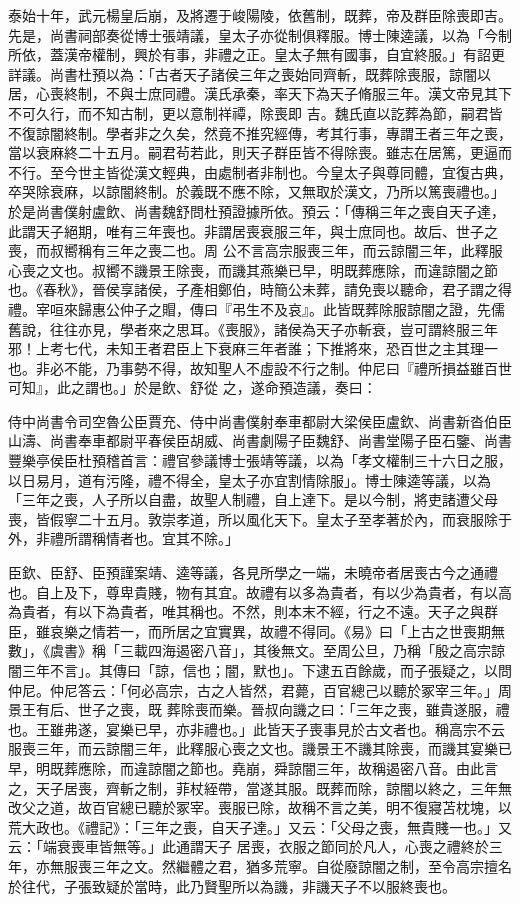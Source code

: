 \begin{pinyinscope}
 泰始十年，武元楊皇后崩，及將遷于峻陽陵，依舊制，既葬，帝及群臣除喪即吉。先是，尚書祠部奏從博士張靖議，皇太子亦從制俱釋服。博士陳逵議，以為「今制所依，蓋漢帝權制，興於有事，非禮之正。皇太子無有國事，自宜終服。」有詔更詳議。尚書杜預以為：「古者天子諸侯三年之喪始同齊斬，既葬除喪服，諒闇以居，心喪終制，不與士庶同禮。漢氏承秦，率天下為天子脩服三年。漢文帝見其下不可久行，而不知古制，更以意制祥禫，除喪即
 吉。魏氏直以訖葬為節，嗣君皆不復諒闇終制。學者非之久矣，然竟不推究經傳，考其行事，專謂王者三年之喪，當以衰麻終二十五月。嗣君茍若此，則天子群臣皆不得除喪。雖志在居篤，更逼而不行。至今世主皆從漢文輕典，由處制者非制也。今皇太子與尊同體，宜復古典，卒哭除衰麻，以諒闇終制。於義既不應不除，又無取於漢文，乃所以篤喪禮也。」於是尚書僕射盧飲、尚書魏舒問杜預證據所依。預云：「傳稱三年之喪自天子達，此謂天子絕期，唯有三年喪也。非謂居喪衰服三年，與士庶同也。故后、世子之喪，而叔嚮稱有三年之喪二也。周
 公不言高宗服喪三年，而云諒闇三年，此釋服心喪之文也。叔嚮不譏景王除喪，而譏其燕樂已早，明既葬應除，而違諒闇之節也。《春秋》，晉侯享諸侯，子產相鄭伯，時簡公未葬，請免喪以聽命，君子謂之得禮。宰咺來歸惠公仲子之賵，傳曰『弔生不及哀』。此皆既葬除服諒闇之證，先儒舊說，往往亦見，學者來之思耳。《喪服》，諸侯為天子亦斬衰，豈可謂終服三年邪！上考七代，未知王者君臣上下衰麻三年者誰；下推將來，恐百世之主其理一也。非必不能，乃事勢不得，故知聖人不虛設不行之制。仲尼曰『禮所損益雖百世可知』，此之謂也。」於是飲、舒從
 之，遂命預造議，奏曰：



 侍中尚書令司空魯公臣賈充、侍中尚書僕射奉車都尉大梁侯臣盧欽、尚書新沓伯臣山濤、尚書奉車都尉平春侯臣胡威、尚書劇陽子臣魏舒、尚書堂陽子臣石鑒、尚書豐樂亭侯臣杜預稽首言：禮官參議博士張靖等議，以為「孝文權制三十六日之服，以日易月，道有污隆，禮不得全，皇太子亦宜割情除服」。博士陳逵等議，以為「三年之喪，人子所以自盡，故聖人制禮，自上達下。是以今制，將吏諸遭父母喪，皆假寧二十五月。敦崇孝道，所以風化天下。皇太子至孝著於內，而衰服除于外，非禮所謂稱情者也。宜其不除。」



 臣欽、臣舒、臣預謹案靖、逵等議，各見所學之一端，未曉帝者居喪古今之通禮也。自上及下，尊卑貴賤，物有其宜。故禮有以多為貴者，有以少為貴者，有以高為貴者，有以下為貴者，唯其稱也。不然，則本末不經，行之不遠。天子之與群臣，雖哀樂之情若一，而所居之宜實異，故禮不得同。《易》曰「上古之世喪期無數」，《虞書》稱「三載四海遏密八音」，其後無文。至周公旦，乃稱「殷之高宗諒闇三年不言」。其傳曰「諒，信也；闇，默也」。下逮五百餘歲，而子張疑之，以問仲尼。仲尼答云：「何必高宗，古之人皆然，君薨，百官總己以聽於冢宰三年。」周景王有后、世子之喪，既
 葬除喪而樂。晉叔向譏之曰：「三年之喪，雖貴遂服，禮也。王雖弗遂，宴樂已早，亦非禮也。」此皆天子喪事見於古文者也。稱高宗不云服喪三年，而云諒闇三年，此釋服心喪之文也。譏景王不譏其除喪，而譏其宴樂已早，明既葬應除，而違諒闇之節也。堯崩，舜諒闇三年，故稱遏密八音。由此言之，天子居喪，齊斬之制，菲杖絰帶，當遂其服。既葬而除，諒闇以終之，三年無改父之道，故百官總已聽於冢宰。喪服已除，故稱不言之美，明不復寢苫枕塊，以荒大政也。《禮記》：「三年之喪，自天子達。」又云：「父母之喪，無貴賤一也。」又云：「端衰喪車皆無等。」此通謂天子
 居喪，衣服之節同於凡人，心喪之禮終於三年，亦無服喪三年之文。然繼體之君，猶多荒寧。自從廢諒闇之制，至令高宗擅名於往代，子張致疑於當時，此乃賢聖所以為譏，非譏天子不以服終喪也。




\end{pinyinscope}
